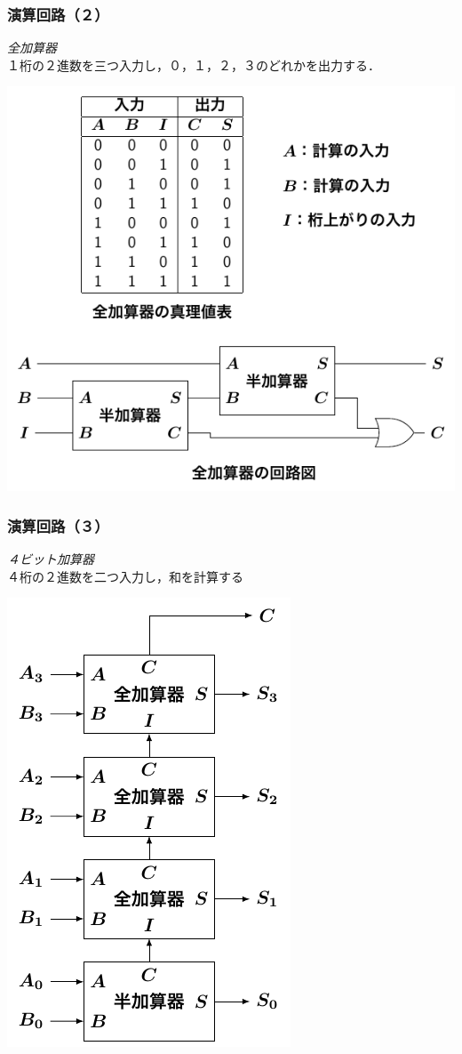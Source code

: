\documentclass[handout]{beamer}        %
\begin{document}
\begin{frame}
  \frametitle{演算回路（２）}
  \emph{全加算器} \\
  １桁の２進数を三つ入力し，０，１，２，３のどれかを出力する．
  \vfill
  \centerline{\includegraphics[scale=1.3]{../Tikz/fa.pdf}}
  \vfill
\end{frame}

\begin{frame}
  \frametitle{演算回路（３）}
  \emph{４ビット加算器} \\
  ４桁の２進数を二つ入力し，和を計算する
  \vfill
  \centerline{\includegraphics[scale=0.8]{../Tikz/adder.pdf}}
  \vfill
\end{frame}
\end{document}
